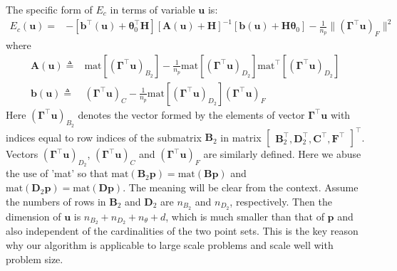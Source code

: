 \documentclass[11pt,bezier,]{article}
\begin{document}
The specific form of $E_{c}$ in terms of variable $\mathbf u$ is:
\begin{align}
 E_{c}(\mathbf u)
= &-[\mathbf b^\top(\mathbf u) + \boldsymbol\theta_0^\top\mathbf H]
[\mathbf A(\mathbf u)+\mathbf H]^{-1} [\mathbf b(\mathbf u) + \mathbf H\boldsymbol\theta_0] %
-\frac{1}{n_p}\| (\mathbf \Gamma^\top\mathbf u)_F \|^2
   \label{eng_reg_u}
\end{align}
where
\begin{align*}
\mathbf A(\mathbf u)\triangleq &
\text{mat}[(\mathbf \Gamma^\top\mathbf u)_{B_2}]
-\frac{1}{n_p} \text{mat}[(\mathbf\Gamma^\top\mathbf u)_{D_2}] \text{mat}^\top[(\mathbf\Gamma^\top\mathbf u)_{D_2}] \\
\mathbf b(\mathbf u)  \triangleq &
(\mathbf \Gamma^\top\mathbf u)_C -\frac{1}{n_p} \text{mat}[(\mathbf \Gamma^\top\mathbf u)_{D_2}] (\mathbf \Gamma^\top\mathbf u)_F
\end{align*}
Here $(\mathbf \Gamma^\top\mathbf u)_{B_2}$ 
denotes the vector formed by the elements of vector $\mathbf \Gamma^\top\mathbf u$
with  indices  equal to row indices of the submatrix $\mathbf B_2$ 
in matrix $\begin{bmatrix}
 \mathbf B_2^\top,\mathbf D_2^\top,\mathbf C^\top,\mathbf F^\top
  \end{bmatrix}^\top$.
Vectors $(\mathbf \Gamma^\top\mathbf u)_{D_2}$,
$(\mathbf \Gamma^\top\mathbf u)_{C}$ and $(\mathbf \Gamma^\top\mathbf u)_{F}$ are similarly defined.                                                                   
Here we abuse the use of 'mat' so that 
$\text{mat}(\mathbf B_2\mathbf p) =\text{mat}(\mathbf B\mathbf p)$
and $\text{mat}(\mathbf D_2\mathbf p) =\text{mat}(\mathbf D\mathbf p)$.
The meaning will be clear from the context.
Assume the numbers of rows in $\mathbf B_2$ and $\mathbf D_2$ are $n_{B_2}$ and $n_{D_2}$, respectively.
Then the dimension of $\mathbf u$ is $n_{B_2}+n_{D_2} + n_\theta +d$,
which is much smaller than that of $\mathbf p$ and also independent of the cardinalities  of the two point sets.
This is the key reason why  our algorithm is applicable to large scale problems
and  scale well with  problem size.
\end{document}
